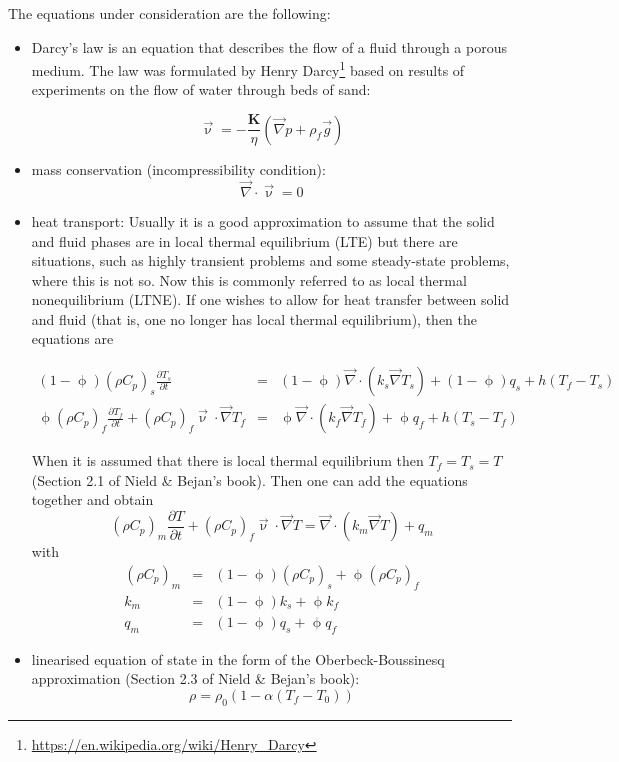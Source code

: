 The equations under consideration are the following:
\begin{itemize}
\item Darcy's law is an equation that describes the flow of a fluid through a porous medium. The law was formulated by Henry Darcy\footnote{\url{https://en.wikipedia.org/wiki/Henry_Darcy}}
based on results of experiments on the flow of water through beds of sand:

\begin{equation}
\vec{\upnu} = -\frac{{\bm K}}{\eta} (\vec\nabla p + \rho_f \vec{g})
\label{eq:darcy}
\end{equation}


\item mass conservation (incompressibility condition):
\begin{equation}
\vec\nabla\cdot\vec\upnu = 0
\label{eq:porous:incomp}
\end{equation}
\item heat transport:
Usually it is a good approximation to assume that the solid and fluid phases are in local
thermal equilibrium (LTE) but there are situations, such as highly transient problems and
some steady-state problems, where this is not so. Now this is commonly referred to as local thermal nonequilibrium (LTNE). If one wishes to allow for heat transfer between solid and fluid (that is, one no longer has local thermal equilibrium), then the equations are

\begin{eqnarray}
(1-\upphi)(\rho C_p)_s \frac{\partial T_s}{\partial t}
&=& (1-\upphi) \vec\nabla \cdot (k_s \vec\nabla T_s)
+ (1-\upphi) q_s + h (T_f-T_s) \\
\upphi (\rho C_p)_f  \frac{\partial T_f}{\partial t}
+ (\rho C_p)_f \vec\upnu \cdot \vec\nabla T_f 
&=& \upphi \vec\nabla \cdot (k_f \vec\nabla T_f)
+ \upphi q_f + h (T_s-T_f)
\end{eqnarray}

When it is assumed that there is local thermal equilibrium then $T_f=T_s=T$ (Section 2.1 of Nield \& Bejan's book). 
Then one can add the equations together and obtain 
\[
(\rho C_p)_m \frac{\partial T}{\partial t} 
+
(\rho C_p)_f \vec{\upnu} \cdot \vec\nabla T 
= 
\vec\nabla \cdot ( k_m \vec\nabla T)
+ q_m
\]
with 
\begin{eqnarray}
(\rho C_p)_m &=& (1-\upphi) (\rho C_p)_s + \upphi (\rho C_p)_ f\\ k_m &=& (1-\upphi) k_s + \upphi k_f \\
q_m &=& (1-\upphi) q_s + \upphi q_f 
\end{eqnarray}

\item linearised equation of state in the form of the Oberbeck-Boussinesq approximation (Section 2.3 of Nield \& Bejan's book):
\[
\rho=\rho_0(1-\alpha(T_f-T_0))
\]
\end{itemize}

